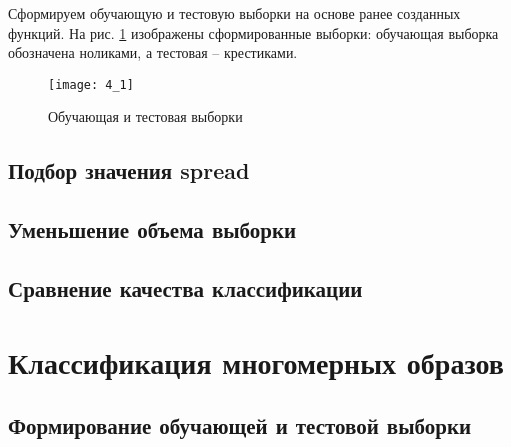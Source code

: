 Сформируем обучающую и тестовую выборки на основе ранее созданных функций. На рис. \ref{fig:4_1} изображены сформированные выборки: обучающая выборка обозначена ноликами, а тестовая -- крестиками.
\begin{figure}[H]
\begin{center}
	\texttt{[image: 4\_1]}
	\caption{Обучающая и тестовая выборки}
	\label{fig:4_1}
\end{center}
\end{figure}

\subsection{Подбор значения spread}


\subsection{Уменьшение объема выборки}


\subsection{Сравнение качества классификации}


\newpage

\section{Классификация многомерных образов}

\subsection{Формирование обучающей и тестовой выборки}

